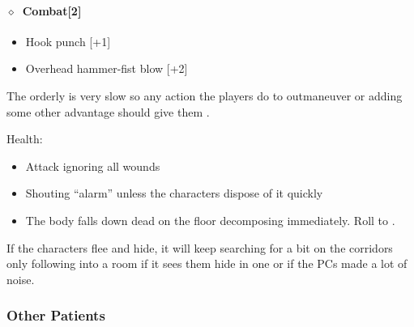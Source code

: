 \paragraph{\(\diamond\)~Combat[2]}%
\begin{itemize}[noitemsep]
  \item Hook punch [+1]
  \item Overhead hammer-fist blow [+2]
\end{itemize}
The orderly is very slow so any action the players do to outmaneuver or adding some other advantage should give them .

Health:   

\begin{itemize}[noitemsep]
  \item Attack ignoring all wounds
  \item Shouting “alarm” unless the characters dispose of it quickly
  \item[\KULTgold{\skull}] The body falls down dead on the floor decomposing immediately.  Roll to .
\end{itemize}

If the characters flee and hide, it will keep searching for a bit on the corridors only following into a room if it sees them
hide in one or if the PCs made a lot of noise.

\subsubsection{Other Patients}%
\label{ssub:other_patients}

